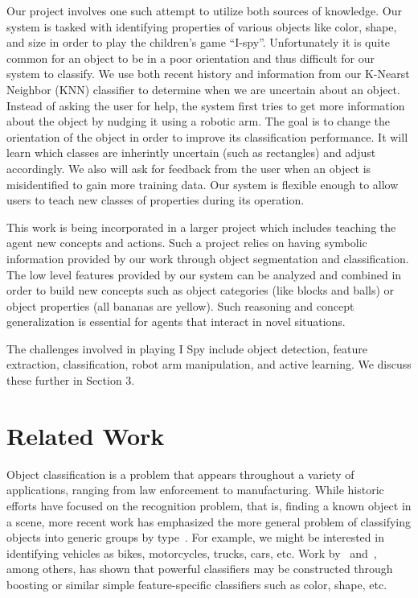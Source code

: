 \documentclass[11pt]{article}
\newcommand{\xxx}[1]{{\bf \color{red} #1}}
\begin{document}
Our project involves one such attempt to utilize both sources of knowledge. Our system is tasked with identifying properties of various objects like color, shape, and size in order to play the children's game ``I-spy''. Unfortunately it is quite common for an object to be in a poor orientation and thus difficult for our system to classify. We use both recent history and information from our K-Nearst Neighbor (KNN) classifier to determine when we are uncertain about an object. Instead of asking the user for help, the system first tries to get more information about the object by nudging it using a robotic arm. The goal is to change the orientation of the object in order to improve its classification performance. It will learn which classes are inherintly uncertain (such as rectangles) and adjust accordingly. We also will ask for feedback from the user when an object is misidentified to gain more training data. Our system is flexible enough to allow users to teach new classes of properties during its operation. 

This work is being incorporated in a larger project which includes teaching the
agent new concepts and actions. Such a project relies on having
symbolic information provided by our work through object segmentation and
classification. The low level features provided by our system can be analyzed and
combined in order to build new concepts such as object categories (like blocks
and balls) or object properties (all bananas are yellow). Such reasoning and
concept generalization is essential for agents that interact in novel situations.

The challenges involved in playing I Spy include object detection, feature
extraction, classification, robot arm manipulation, and active learning. We
discuss these further in Section 3.

\section{Related Work}

Object classification is a problem that appears throughout a variety of
applications, ranging from law enforcement to manufacturing. While historic
efforts have focused on the recognition problem, that is, finding a known object
in a scene, more recent work has emphasized the more general problem of
classifying objects into generic groups by type~\cite{huber2004parts}. For example,
we might be interested in identifying vehicles as bikes, motorcycles, trucks,
cars, etc. Work by~\cite{nilsback2006visual} and~\cite{gehler2009feature}, among
others, has shown that powerful classifiers may be constructed through boosting
or similar simple feature-specific classifiers such as color, shape, etc.
\end{document}
